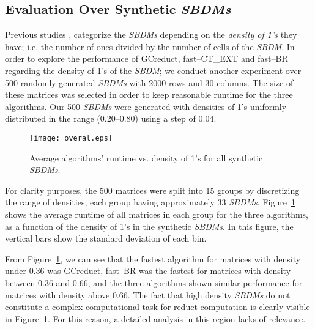 \documentclass[authoryear,11pt]{elsarticle}
\begin{document}
\subsection{Evaluation Over Synthetic \textit{SBDMs}}\label{sub:synth}

  Previous studies \citep{Rojas12,Lias13,Rodriguez15}, categorize the \textit{SBDMs} depending on the \emph{density of 1's} they have; i.e. the number of ones divided by the number of cells of the \textit{SBDM}. In order to explore the performance of GCreduct, fast--CT\_EXT and fast--BR regarding the density of 1's of the \textit{SBDM}; we conduct another experiment over 500 randomly generated \textit{SBDMs} with 2000 rows and 30 columns. The size of these matrices was selected in order to keep reasonable runtime for the three algorithms. Our 500 \textit{SBDMs} were generated with densities of 1's uniformly distributed in the range (0.20--0.80) using a step of 0.04. 

\begin{figure}[htb]
	\begin{center}
		\texttt{[image: overal.eps]}
	\end{center}
	\caption{Average algorithms' runtime vs. density of 1's for all synthetic \textit{SBDMs}.}
	\label{fig:scattDensity}
\end{figure}	

  For clarity purposes, the 500 matrices were split into 15 groups by discretizing the range of densities, each group having approximately 33 \textit{SBDMs}. Figure~\ref{fig:scattDensity} shows the average runtime of all  matrices in each group for the three algorithms, as a function of the density of 1's in the synthetic \textit{SBDMs}. In this figure, the vertical bars show the standard deviation of each bin. 

  From Figure~\ref{fig:scattDensity}, we can see that the fastest algorithm for matrices with density under 0.36 was GCreduct, fast--BR was the fastest for matrices with density between 0.36 and 0.66, and the three algorithms shown similar performance for matrices with density above 0.66. The fact that high density \textit{SBDMs} do not constitute a complex computational task for reduct computation \citep{Rojas12} is clearly visible in Figure~\ref{fig:scattDensity}. For this reason, a detailed analysis in this region lacks of relevance.
\end{document}
